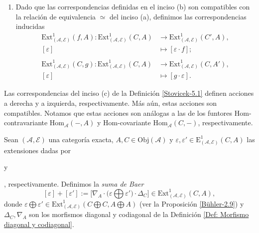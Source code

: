 \documentclass[tesis]{subfiles}
\begin{document}
\begin{Def}
\begin{enumerate}[label=(\alph*)]
        \item Dado que las correspondencias definidas en el inciso (b) son compatibles con la relación de equivalencia $\simeq$ del inciso (a), definimos las correspondencias inducidas
            \begin{align*}
                \text{Ext}^1_{(\mathscr{A},\mathscr{E})}(f,A):\text{Ext}^1_{(\mathscr{A},\mathscr{E})}(C,A)&\to \text{Ext}^1_{(\mathscr{A},\mathscr{E})}(C',A), \\
                [\varepsilon] &\mapsto [\varepsilon\cdot f]; \\ \\
                \text{Ext}^1_{(\mathscr{A},\mathscr{E})}(C,g):\text{Ext}^1_{(\mathscr{A},\mathscr{E})}(C,A)&\to \text{Ext}^1_{(\mathscr{A},\mathscr{E})}(C,A'), \\
                [\varepsilon] &\mapsto [g\cdot\varepsilon].
            \end{align*}
    \end{enumerate}
\end{Def}

\begin{Obs}\label{análogo_a_Mendoza_1.10.22}
    Las correspondencias del inciso (c) de la Definición \ref{Stovicek-5.1} definen acciones a derecha y a izquierda, respectivamente. Más aún, estas acciones son compatibles. Notamos que estas acciones son análogas a las de los funtores Hom-contravariante $\text{Hom}_\mathscr{A}(-,A)$ y Hom-covariante $\text{Hom}_\mathscr{A}(C,-)$, respectivamente.
\end{Obs}

\begin{Def}
    Sean $(\mathscr{A},\mathscr{E})$ una categoría exacta, $A,C\in\text{Obj}(\mathscr{A})$ y $\varepsilon,\varepsilon'\in\text{E}_{(\mathscr{A},\mathscr{E})}^1(C,A)$ las extensiones dadas por  y , respectivamente. Definimos la \emph{suma de Baer}
    \[
        [\varepsilon] + [\varepsilon'] := \big[\nabla_A\cdot\big(\varepsilon\bigoplus\varepsilon'\big)\cdot\Delta_C\big] \in \text{Ext}_{(\mathscr{A},\mathscr{E})}^{1}(C,A),
    \] 
    donde $\varepsilon\bigoplus\varepsilon'\in\text{Ext}_{(\mathscr{A},\mathscr{E})}^1(C\bigoplus C, A\bigoplus A)$ (ver la Proposición \ref{Bühler-2.9}) y $\Delta_C, \nabla_A$ son los morfismos diagonal y codiagonal de la Definición \ref{Def: Morfismo diagonal y codiagonal}.
\end{Def}
\end{document}
